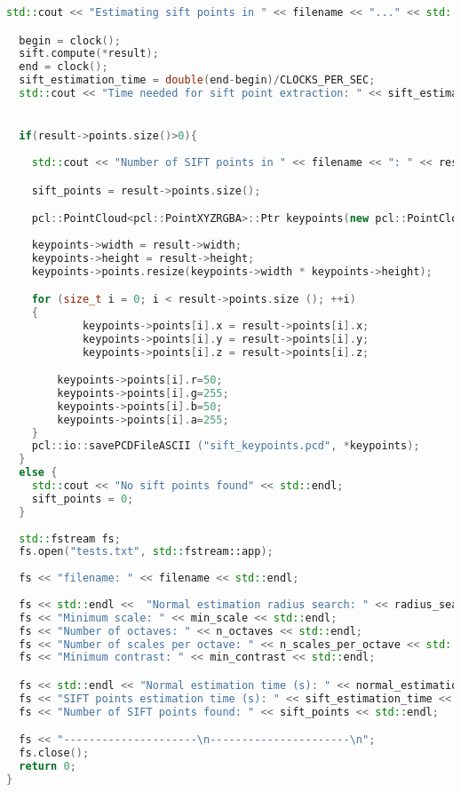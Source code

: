 \begin{lstlisting}[language=C++,breaklines]
  std::cout << "Estimating sift points in " << filename << "..." << std::endl;

  begin = clock();
  sift.compute(*result);
  end = clock();
  sift_estimation_time = double(end-begin)/CLOCKS_PER_SEC;
  std::cout << "Time needed for sift point extraction: " << sift_estimation_time << " seconds" << std::endl << std::endl;


  if(result->points.size()>0){
  
  	std::cout << "Number of SIFT points in " << filename << ": " << result->points.size () << std::endl;

	sift_points = result->points.size();

	pcl::PointCloud<pcl::PointXYZRGBA>::Ptr keypoints(new pcl::PointCloud<pcl::PointXYZRGBA>);
  
	keypoints->width = result->width;
	keypoints->height = result->height;
	keypoints->points.resize(keypoints->width * keypoints->height);

   	for (size_t i = 0; i < result->points.size (); ++i)
  	{
    		keypoints->points[i].x = result->points[i].x;
    		keypoints->points[i].y = result->points[i].y;
    		keypoints->points[i].z = result->points[i].z;

  		keypoints->points[i].r=50;
  		keypoints->points[i].g=255;
  		keypoints->points[i].b=50;
  		keypoints->points[i].a=255;
  	}
  	pcl::io::savePCDFileASCII ("sift_keypoints.pcd", *keypoints);
  }
  else {
  	std::cout << "No sift points found" << std::endl;
	sift_points = 0;
  }
 
  std::fstream fs;
  fs.open("tests.txt", std::fstream::app);
  
  fs << "filename: " << filename << std::endl;
  
  fs << std::endl <<  "Normal estimation radius search: " << radius_search << std::endl; 
  fs << "Minimum scale: " << min_scale << std::endl;
  fs << "Number of octaves: " << n_octaves << std::endl;
  fs << "Number of scales per octave: " << n_scales_per_octave << std::endl;
  fs << "Minimum contrast: " << min_contrast << std::endl;

  fs << std::endl << "Normal estimation time (s): " << normal_estimation_time << std::endl;
  fs << "SIFT points estimation time (s): " << sift_estimation_time << std::endl;
  fs << "Number of SIFT points found: " << sift_points << std::endl;

  fs << "---------------------\n----------------------\n";
  fs.close();
  return 0;
}
\end{lstlisting}
